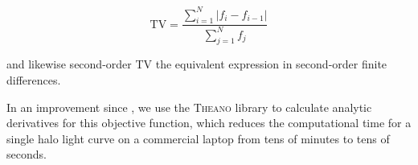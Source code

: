 \documentclass[modern]{aastex61}
\begin{document}
\begin{equation}
\text{TV} = \dfrac{\sum_{i=1}^{N} |{f}_i - {f}_{i-1}|}{\sum_{j=1}^{N} {f}_j}
\end{equation}

\noindent and likewise second-order TV the equivalent expression in second-order finite differences. 

In an improvement since \citet{White2017}, we use the \textsc{Theano} library \citep{theano} to calculate analytic derivatives for this objective function, which reduces the computational time for a single halo light curve on a commercial laptop from tens of minutes to tens of seconds. 


\end{document}
